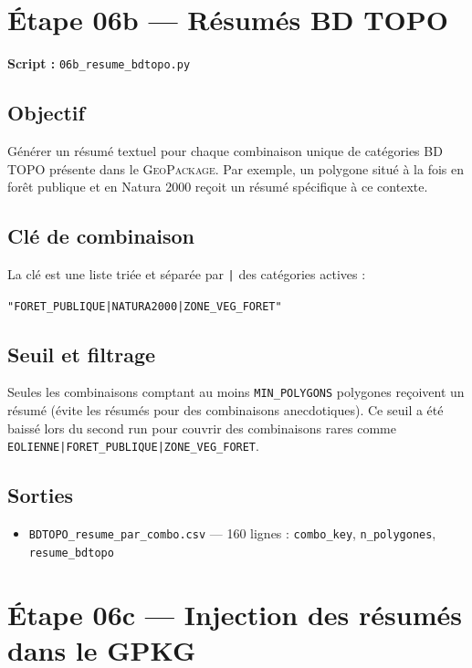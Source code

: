 \documentclass[11pt,a4paper]{report}
\newcommand{\code}[1]{\texttt{\small #1}}
\newcommand{\gpkg}{\textsc{GeoPackage}}
\newcommand{\bdtopo}{\textsc{BD TOPO}}
\begin{document}
\section{Étape 06b — Résumés BD TOPO}

\textbf{Script :} \code{06b\_resume\_bdtopo.py}

\subsection{Objectif}

Générer un résumé textuel pour chaque combinaison unique de catégories \bdtopo{} présente dans le \gpkg{}. Par exemple, un polygone situé à la fois en forêt publique et en Natura 2000 reçoit un résumé spécifique à ce contexte.

\subsection{Clé de combinaison}

La clé est une liste triée et séparée par \code{|} des catégories actives :
\begin{center}
\code{"FORET\_PUBLIQUE|NATURA2000|ZONE\_VEG\_FORET"}
\end{center}

\subsection{Seuil et filtrage}

Seules les combinaisons comptant au moins \code{MIN\_POLYGONS} polygones reçoivent un résumé (évite les résumés pour des combinaisons anecdotiques). Ce seuil a été baissé lors du second run pour couvrir des combinaisons rares comme \code{EOLIENNE|FORET\_PUBLIQUE|ZONE\_VEG\_FORET}.

\subsection{Sorties}

\begin{itemize}
  \item \code{BDTOPO\_resume\_par\_combo.csv} — 160 lignes : \code{combo\_key}, \code{n\_polygones}, \code{resume\_bdtopo}
\end{itemize}

\section{Étape 06c — Injection des résumés dans le GPKG}
\end{document}
